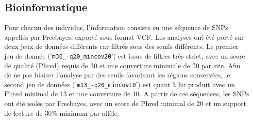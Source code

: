 
\subsection{Bioinformatique}

Pour chacun des individus, l'information consiste en une séquence de SNPs appellés par Freebayes, exporté sous format VCF. 
Les analyses ont été porté sur deux jeux de données différents car filtrés sous des seuils différents.
Le premier jeu de donnée ('\verb|m30_-q20_mincov20|') est issus de filtres très strict, avec un score de qualité (Phred) requis de 30 et une couverture minimale de 20 par site. 
Afin de ne pas biaiser l'analyse par des seuils favorisant les régions conservées, le second jeu de données ('\verb|m13_-q20_mincov10|') est quant à lui produit avec un Phred minimal de 13 et une couverture de 10. 
A partir de ces séquences, les SNPs ont été isolés par Freebayes, avec un score de Phred minimal de 20 et un support de lecture de 30\% minimum par allèle.


